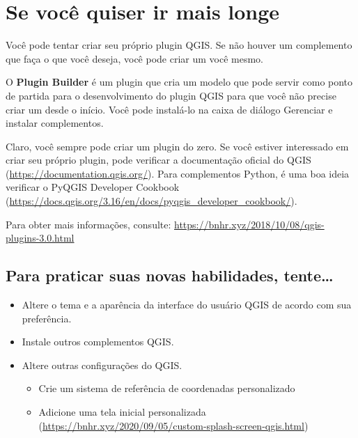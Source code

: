 \documentclass[
]{krantz}
\providecommand{\tightlist}{%
  \setlength{\itemsep}{0pt}\setlength{\parskip}{0pt}}
\begin{document}
\hypertarget{se-vocuxea-quiser-ir-mais-longe-1}{%
\section{Se você quiser ir mais longe}\label{se-vocuxea-quiser-ir-mais-longe-1}}

Você pode tentar criar seu próprio plugin QGIS. Se não houver um complemento que faça o que você deseja, você pode criar um você mesmo.

O \textbf{Plugin Builder} é um plugin que cria um modelo que pode servir como ponto de partida para o desenvolvimento do plugin QGIS para que você não precise criar um desde o início. Você pode instalá-lo na caixa de diálogo Gerenciar e instalar complementos.

Claro, você sempre pode criar um plugin do zero. Se você estiver interessado em criar seu próprio plugin, pode verificar a documentação oficial do QGIS (\url{https://documentation.qgis.org/}). Para complementos Python, é uma boa ideia verificar o PyQGIS Developer Cookbook (\href{https://docs.qgis.org/3.16/en/docs/pyqgis_developer_cookbook\%20/}{https://docs.qgis.org/3.16/en/docs/pyqgis\_developer\_cookbook/}).

Para obter mais informações, consulte: \href{https://bnhr.xyz/2018/10/08/qgis-plugins-3.0.\%20html}{https://bnhr.xyz/2018/10/08/qgis-plugins-3.0.html}

\hypertarget{para-praticar-suas-novas-habilidades-tente}{%
\subsection{Para praticar suas novas habilidades, tente\ldots{}}\label{para-praticar-suas-novas-habilidades-tente}}

\begin{itemize}
\tightlist
\item
  Altere o tema e a aparência da interface do usuário QGIS de acordo com sua preferência.
\item
  Instale outros complementos QGIS.
\item
  Altere outras configurações do QGIS.

  \begin{itemize}
  \tightlist
  \item
    Crie um sistema de referência de coordenadas personalizado
  \item
    Adicione uma tela inicial personalizada (\href{https://bnhr.xyz/2020/09/05/custom-splash\%20-screen-qgis.html}{https://bnhr.xyz/2020/09/05/custom-splash-screen-qgis.html})
  \end{itemize}
\end{itemize}
\end{document}
